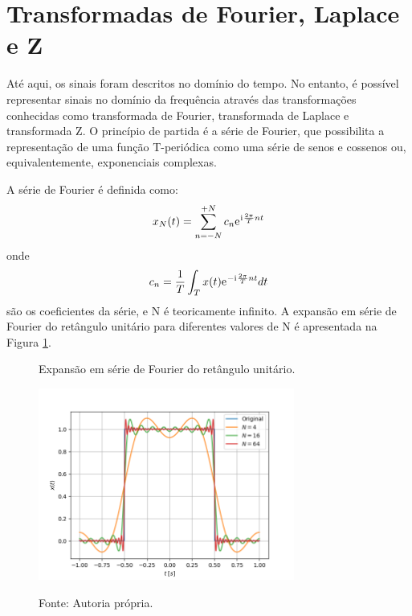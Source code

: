 \documentclass[12pt,a4paper]{report}
\newcommand{\I}{{\mathrm{i}\mkern1mu}}
\newcommand{\euler}{{\mathrm{e}\mkern1mu}}
\begin{document}
\section{Transformadas de Fourier, Laplace e Z}
  Até aqui, os sinais foram descritos no domínio do tempo. No entanto, é possível representar sinais no
  domínio da frequência através das transformações conhecidas como transformada de Fourier, transformada de
  Laplace e transformada Z. O princípio de partida é a série de Fourier, que possibilita a representação de uma
  função T-periódica como uma série de senos e cossenos ou, equivalentemente, exponenciais complexas.

  A série de Fourier é definida como:
  \begin{equation}
    x_N(t) = \sum_{n = -N}^{+N} c_n \euler^{\I \frac{2 \pi}{T} n t}
  \end{equation}
  onde
  \begin{equation}
    c_n = \frac{1}{T} \int_T x(t) \euler^{-\I \frac{2 \pi}{T} n t} dt
  \end{equation}
  são os coeficientes da série, e N é teoricamente infinito. A expansão em série de Fourier do retângulo unitário
  para diferentes valores de N é apresentada na Figura \ref{fig:fourier}.
  \begin{figure}[H]
    \caption{Expansão em série de Fourier do retângulo unitário.}
    \centering
    \includegraphics[width=0.75\textwidth]{fourier_series}
    \label{fig:fourier}
    \caption*{Fonte: Autoria própria.}
  \end{figure}
\end{document}
